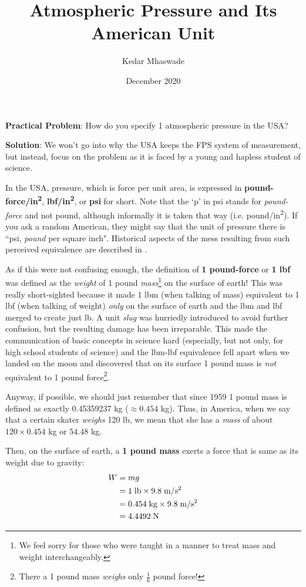\documentclass[a6paper]{article}
\begin{document}
\title{Atmospheric Pressure and Its American Unit}
\author{Kedar Mhaswade}
\date{December 2020}
\maketitle
\textbf{Practical Problem}: 
How do you specify 1 atmospheric pressure in the USA?

\textbf{Solution}:
We won't go into why the USA keeps the FPS system of measurement, but instead, focus on the problem as it is faced by a young and hapless student of science.

In the USA, pressure, which is force per unit area, is expressed in \textbf{pound-force/in\textsuperscript{2}}, \textbf{lbf/in\textsuperscript{2}}, or \textbf{psi} for short. Note that the `p' in psi stands for \emph{pound-force} and not pound, although informally it is taken that way (i.e. pound/in\textsuperscript{2}). If you ask a random American, they might say that the unit of pressure there is ``psi, \emph{pound} per square inch". Historical aspects of the mess resulting from such perceived equivalence are described in \cite{esu}.

As if this were not confusing enough, the definition of \textbf{1 pound-force} or \textbf{1 lbf} was defined as the \emph{weight} of 1 pound \emph{mass}\footnote{We feel sorry for those who were taught in a manner to treat mass and weight interchangeably.} on the surface of earth! This was really short-sighted because it made 1 lbm (when talking of mass) equivalent to 1 lbf (when talking of weight) \emph{only} on the surface of earth and the lbm and lbf merged to create just lb. A unit \emph{slug} was hurriedly introduced to avoid further confusion, but the resulting damage has been irreparable. This made the communication of basic concepts in science hard (especially, but not only, for high school students of science) and the lbm-lbf equivalence fell apart when we landed on the moon and discovered that on its surface 1 pound mass is \emph{not} equivalent to 1 pound force\footnote{There a 1 pound mass \emph{weighs} only $\frac{1}{6}$ pound force!}.

Anyway, if possible, we should just remember that since 1959 \cite{pound-mass-current} 1 pound mass is defined as exactly 0.45359237 \si{kg} ($\approx 0.454$ \si{kg}). Thus, in America, when we say that a certain skater \emph{weighs} 120 lb, we mean that she has a \emph{mass} of about $120\times 0.454$ \si{kg} or $54.48$ \si{kg}.

Then, on the surface of earth, a \textbf{1 pound mass} exerts a force that is same as its weight due to gravity:
\begin{align*}
    W 
    &= mg \\
    &= 1\; \text{lb} \times 9.8\; \text{m/s\textsuperscript{2}} \\
    &= 0.454\; \text{kg} \times 9.8\; \text{m/s\textsuperscript{2}}\\
    &= 4.4492\; \text{N} 
\end{align*}
\end{document}
